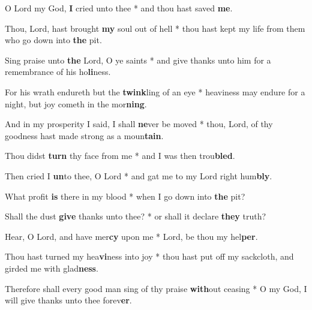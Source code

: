 \begin{multicols}{2}
	O Lord my God, \textbf{I} cried unto thee * and thou hast saved \textbf{me}.
	
	Thou, Lord, hast brought \textbf{my} soul out of hell * thou hast kept my life from them who go down into \textbf{the} pit.
	
	Sing praise unto \textbf{the} Lord, O ye saints * and give thanks unto him for a remembrance of his ho\textbf{li}ness.
	
	For his wrath endureth but the \textbf{twink}ling of an eye * heaviness may endure for a night, but joy cometh in the mor\textbf{ning}.
	
	And in my prosperity I said, I shall \textbf{ne}ver be moved * thou, Lord, of thy goodness hast made strong as a moun\textbf{tain}.
	
	Thou didst \textbf{turn} thy face from me * and I was then trou\textbf{bled}.
	
	Then cried I \textbf{un}to thee, O Lord * and gat me to my Lord right hum\textbf{bly}.
	
	What profit \textbf{is} there in my blood * when I go down into \textbf{the} pit?
	
	Shall the dust \textbf{give} thanks unto thee? * or shall it declare \textbf{they} truth?
	
	Hear, O Lord, and have mer\textbf{cy} upon me * Lord, be thou my hel\textbf{per}.
	
	Thou hast turned my hea\textbf{vi}ness into joy * thou hast put off my sackcloth, and girded me with glad\textbf{ness}.
	
	Therefore shall every good man sing of thy praise \textbf{with}out ceasing * O my God, I will give thanks unto thee forev\textbf{er}.
\end{multicols}